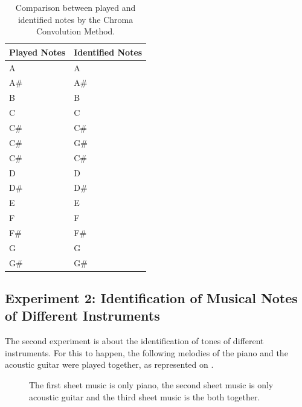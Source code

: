 \documentclass{article}
\begin{document}
	

	\begin{table}[h!]
	 \begin{center}
	 \begin{tabular}{|l|l|}
	  \hline
	  Played Notes & Identified Notes \\
	  \hline
	  A  & A \\
	  A\#  & A\# \\
	  B  & B \\
	  C  & C \\
	  C\#  & C\# \\
	  C\#  & G\# \\
	  C\#  & C\# \\
	  D  & D \\
	  D\#  & D\# \\
	  E  & E \\
	  F  & F \\
	  F\#  & F\# \\
	  G  & G \\
	  G\#  & G\# \\
	  \hline
	 \end{tabular}
	\end{center}
	 \caption{Comparison between played and identified notes by the Chroma Convolution Method.}
	 \label{tab:table-1-ccm}
	\end{table}


	\subsection{Experiment 2: Identification of Musical Notes of Different Instruments}

	The second experiment is about the identification of tones of different instruments. For this to happen, the following melodies of the piano and the acoustic guitar were played together, as represented on .

	\begin{figure}[h!]
	 \centerline{}
	 \centerline{}
	 \centerline{}
	 \caption{The first sheet music is only piano, the second sheet music is only acoustic guitar and the third sheet music is the both together.}
	 \label{fig:2-melodias}
	\end{figure}
\end{document}
